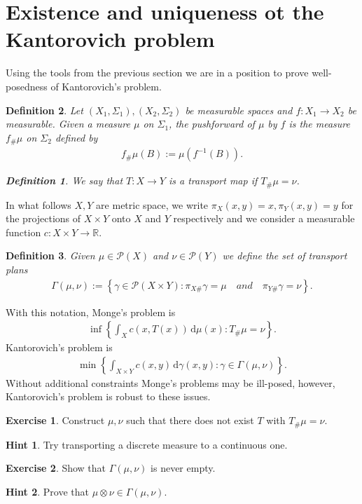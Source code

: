 \documentclass[
    a4paper,
    DIV=14,
    abstract=true,
    numbers=noenddot
]
{scrartcl}
\newtheorem{definition}[definition]{Definition}
\theoremstyle{definition}
\newtheorem{exercise}{Exercise}
\newtheorem*{hint}{Hint}
\newcommand{\set}[1]{\left\{#1\right\}}
\renewcommand{\d}{\,\mathrm{d}}\newcommand{\dx}{\,\mathrm{d}x}
\newcommand{\R}{\mathbb{R}}
\newcommand{\Pp}{\mathcal{P}}
\begin{document}
\section{Existence and uniqueness ot the Kantorovich problem}
Using the tools from the previous section we are in a position to prove well-posedness of Kantorovich's problem.
\begin{definition}
    Let $(X_1, \Sigma_1),(X_2, \Sigma_2)$ be measurable spaces and $f: X_1 \to X_2$ be measurable. Given a measure $\mu $ on  $\Sigma_1$, the \emph{pushforward} of $\mu $ by $f$ is the measure $f_{\#} \mu $  on $\Sigma_2$ defined by
    \begin{align*}
        f_{\#} \mu(B):= \mu (f ^{-1}(B)).
    \end{align*}
    \begin{definition}
        We say that $T: X \to Y$ is a \emph{transport map} if $T_{\#}\mu = \nu $.
    \end{definition}

\end{definition}
In what follows $X,Y$ are metric space, we write $\pi_X(x,y)=x, \pi _Y(x,y)=y$ for the projections of $X\times Y$ onto $X$ and $Y$ respectively and we consider a measurable function $c: X \times Y \to \R$.
\begin{definition}
    Given $\mu \in \Pp (X)$ and $\nu \in \Pp (Y)$ we define the set of \emph{transport plans}
    \begin{align*}
        \Gamma (\mu ,\nu):= \set{\gamma \in \Pp (X \times Y): \pi_{X\#}\gamma = \mu \quad and \quad  \pi_{Y\#}\gamma = \nu }.
    \end{align*}
\end{definition}
With this notation, Monge's problem is
\begin{align}\label{Mobge}
    \inf\set{\int_{X}c(x,T(x)) \d \mu (x): T_{\#} \mu = \nu  }.
\end{align}
Kantorovich's problem is
\begin{align}\label{Kantorovich}
    \min\set{\int_{X\times Y}c(x,y) \d \gamma  (x,y): \gamma \in  \Gamma (\mu ,\nu ) }.
\end{align}
Without additional constraints Monge's problems may be ill-posed, however, Kantorovich's problem is robust to these issues.
\begin{exercise}
    Construct $\mu ,\nu$ such that there does not exist $T$ with $T_{\#} \mu =\nu$.
\end{exercise}
\begin{hint}
    Try transporting a discrete measure to a continuous one.
\end{hint}
\begin{exercise}
    Show that $\Gamma(\mu ,\nu)$ is never empty.
\end{exercise}
\begin{hint}
    Prove that $\mu \otimes \nu \in \Gamma (\mu ,\nu )$.
\end{hint}
\end{document}
